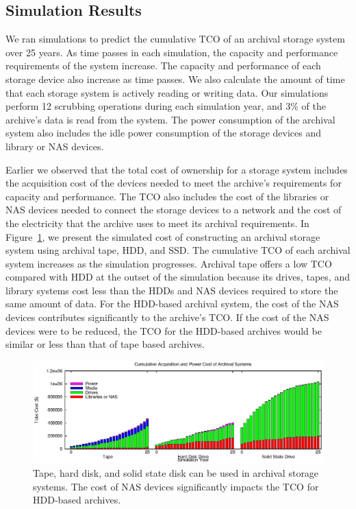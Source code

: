 \subsection{Simulation Results}
We ran simulations to predict the cumulative TCO of an archival storage system over 25 years.  As time passes in each simulation, the capacity and performance requirements of the system increase.  The capacity and performance of each storage device also increase as time passes.  We also calculate the amount of time that each storage system is actively reading or writing data.  Our simulations perform 12 scrubbing operations during each simulation year, and 3\% of the archive's data is read from the system.  The power consumption of the archival system also includes the idle power consumption of the storage devices and library or NAS devices.

Earlier we observed that the total cost of ownership for a storage system includes the acquisition cost of the devices needed to meet the archive's requirements for capacity and performance.  The TCO also includes the cost of the libraries or NAS devices needed to connect the storage devices to a network and the cost of the electricity that the archive uses to meet its archival requirements.  In Figure~\ref{fig1}, we present the simulated cost of constructing an archival storage system using archival tape, HDD, and SSD.  The cumulative TCO of each archival system increases as the simulation progresses.  Archival tape offers a low TCO compared with HDD at the outset of the simulation because its drives, tapes, and library systems cost less than the HDDs and NAS devices required to store the same amount of data.  For the HDD-based archival system, the cost of the NAS devices contributes significantly to the archive's TCO.  If the cost of the NAS devices were to be reduced, the TCO for the HDD-based archives would be similar or less than that of tape based archives.

\begin{figure}[!ht]
\includegraphics[width=\linewidth]{fig1.eps}
\caption{Tape, hard disk, and solid state disk can be used in archival storage systems.  The cost of NAS devices significantly impacts the TCO for HDD-based archives.}
\label{fig1}
\end{figure}

